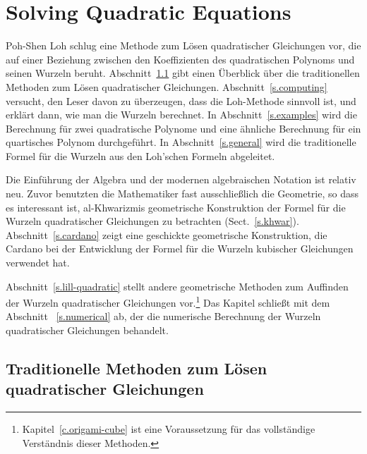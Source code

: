 
\chapter{Solving Quadratic Equations}\label{c.quadratic}


Poh-Shen Loh schlug eine Methode zum Lösen quadratischer Gleichungen vor, die auf einer Beziehung zwischen den Koeffizienten des quadratischen Polynoms und seinen Wurzeln beruht. Abschnitt~\ref{s.traditional} gibt einen Überblick über die traditionellen Methoden zum Lösen quadratischer Gleichungen. 
Abschnitt~\ref{s.computing} versucht, den Leser davon zu überzeugen, dass die Loh-Methode sinnvoll ist, und erklärt dann, wie man die Wurzeln berechnet. In Abschnitt~\ref{s.examples} wird die Berechnung für zwei quadratische Polynome und eine ähnliche Berechnung für ein quartisches Polynom durchgeführt. In Abschnitt~\ref{s.general} wird die traditionelle Formel für die Wurzeln aus den Loh'schen Formeln abgeleitet.

Die Einführung der Algebra und der modernen algebraischen Notation ist relativ neu. Zuvor benutzten die Mathematiker fast ausschließlich die Geometrie, so dass es interessant ist, al-Khwarizmis geometrische Konstruktion der Formel für die Wurzeln quadratischer Gleichungen zu betrachten (Sect.~\ref{s.khwar}). Abschnitt~\ref{s.cardano} zeigt eine geschickte geometrische Konstruktion, die Cardano bei der Entwicklung der Formel für die Wurzeln kubischer Gleichungen verwendet hat.

Abschnitt~\ref{s.lill-quadratic} stellt andere geometrische Methoden zum Auffinden der Wurzeln quadratischer Gleichungen vor.\footnote{Kapitel~\ref{c.origami-cube} ist eine Voraussetzung für das vollständige Verständnis dieser Methoden.} Das Kapitel schließt mit dem Abschnitt ~\ref{s.numerical} ab, der die numerische Berechnung der Wurzeln quadratischer Gleichungen behandelt.

\section{Traditionelle Methoden zum Lösen quadratischer Gleichungen}\label{s.traditional}

